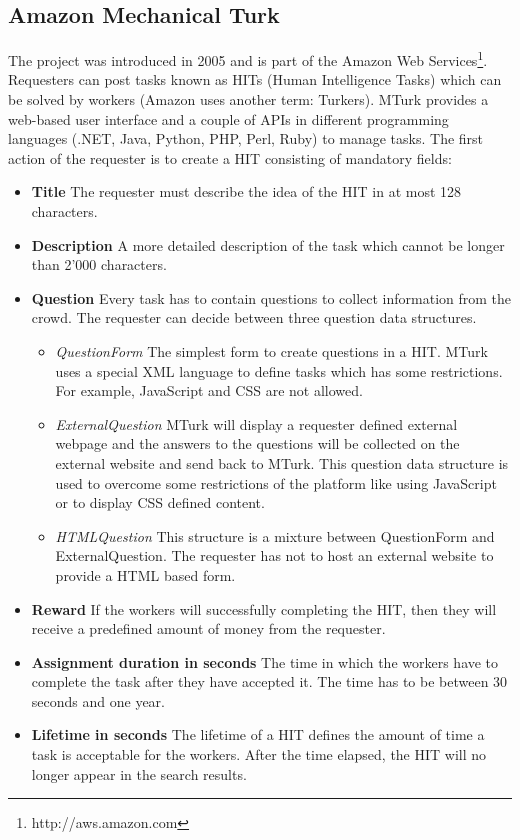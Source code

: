 \subsection{Amazon Mechanical Turk}
The project was introduced in 2005 and is part of the Amazon Web Services\footnote{http://aws.amazon.com}. Requesters can post tasks known as HITs (Human Intelligence Tasks) which can be solved by workers (Amazon uses another term: Turkers). MTurk provides a web-based user interface and a couple of APIs in different programming languages (.NET, Java, Python, PHP, Perl, Ruby) to manage tasks. The first action of the requester is to create a HIT consisting of mandatory fields: 
\begin{itemize}
	\item \textbf{Title} The requester must describe the idea of the HIT in at most 128 characters. 
	\item \textbf{Description} A more detailed description of the task which cannot be longer than 2'000 characters. 
	\item \textbf{Question} Every task has to contain questions to collect information from the crowd. The requester can decide between three question data structures. 
	\begin{itemize}
		\item \textit{QuestionForm} The simplest form to create questions in a HIT. MTurk uses a special XML language to define tasks which has some restrictions. For example, JavaScript and CSS are not allowed. 
		\item \textit{ExternalQuestion} MTurk will display a requester defined external webpage and the answers to the questions will be collected on the external website and send back to MTurk. This question data structure is used to overcome some restrictions of the platform like using JavaScript or to display CSS defined content. 
		\item \textit{HTMLQuestion} This structure is a mixture between QuestionForm and ExternalQuestion. The requester has not to host an external website to provide a HTML based form. 
	\end{itemize}
	\item \textbf{Reward} If the workers will successfully completing the HIT, then they will receive a predefined amount of money from the requester. 
	\item \textbf{Assignment duration in seconds} The time in which the workers have to complete the task after they have accepted it. The time has to be between 30 seconds and one year. 
	\item \textbf{Lifetime in seconds} The lifetime of a HIT defines the amount of time a task is acceptable for the workers. After the time elapsed, the HIT will no longer appear in the search results.
\end{itemize}
